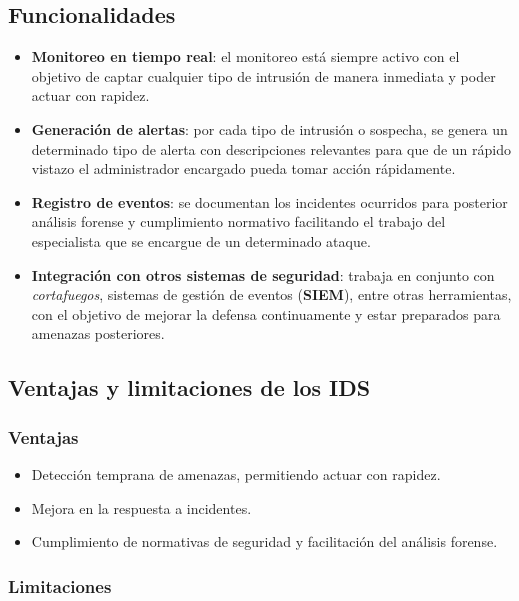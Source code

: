 \documentclass[12pt,a4paper]{report}
\begin{document}
\subsection{Funcionalidades}

\begin{itemize}
	\item \textbf{Monitoreo en tiempo real}: el monitoreo está siempre activo con el objetivo de captar cualquier tipo de intrusión de manera inmediata y poder actuar con rapidez.
	
	\item \textbf{Generación de alertas}: por cada tipo de intrusión o sospecha, se genera un determinado tipo de alerta con descripciones relevantes para que de un rápido vistazo el administrador encargado pueda tomar acción rápidamente.
	
	\item \textbf{Registro de eventos}: se documentan los incidentes ocurridos para posterior análisis forense y cumplimiento normativo facilitando el trabajo del especialista que se encargue de un determinado ataque.
	
	\item \textbf{Integración con otros sistemas de seguridad}: trabaja en conjunto con \textit{cortafuegos}, sistemas de gestión de eventos (\textbf{SIEM}), entre otras herramientas, con el objetivo de mejorar la defensa continuamente y estar preparados para amenazas posteriores.
\end{itemize}



\subsection{Ventajas y limitaciones de los IDS}

\subsubsection{Ventajas}

\begin{itemize}
	\item Detección temprana de amenazas, permitiendo actuar con rapidez.
	\item Mejora en la respuesta a incidentes.
	\item Cumplimiento de normativas de seguridad y facilitación del análisis forense.
\end{itemize}

\subsubsection{Limitaciones}
\end{document}
